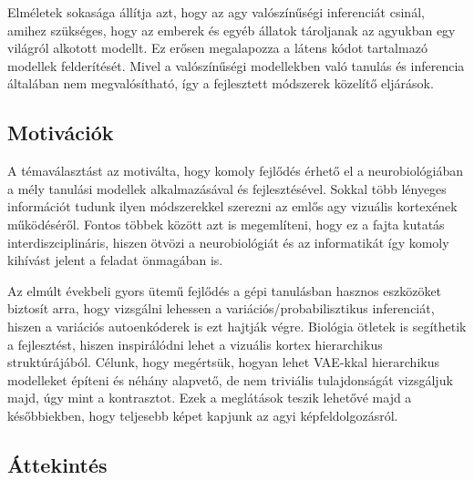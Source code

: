 \documentclass[12pt, english]{article}
\begin{document}
\vspace{4mm}

\par Elméletek sokasága állítja azt, hogy az agy valószínűségi inferenciát csinál, amihez szükséges, hogy az emberek és egyéb állatok tároljanak az agyukban egy világról alkotott modellt. Ez erősen megalapozza a látens kódot tartalmazó modellek felderítését. Mivel a valószínűségi modellekben való tanulás és inferencia általában nem megvalósítható, így a fejlesztett módszerek közelítő eljárások.

\vspace{7mm}

\subsection{Motivációk}

\vspace{7mm}

\par A témaválasztást az motiválta, hogy komoly fejlődés érhető el a neurobiológiában a mély tanulási modellek alkalmazásával és fejlesztésével. Sokkal több lényeges információt tudunk ilyen módszerekkel szerezni az emlős agy vizuális kortexének működéséről. Fontos többek között azt is megemlíteni, hogy ez a fajta kutatás interdiszciplináris, hiszen ötvözi a neurobiológiát és az informatikát így komoly kihívást jelent a feladat önmagában is.

\vspace{4mm}

\par Az elmúlt évekbeli gyors ütemű fejlődés a gépi tanulásban hasznos eszközöket biztosít arra, hogy vizsgálni lehessen a variációs/probabilisztikus inferenciát, hiszen a variációs autoenkóderek is ezt hajtják végre. Biológia ötletek is segíthetik a fejlesztést, hiszen inspirálódni lehet a vizuális kortex hierarchikus struktúrájából. Célunk, hogy megértsük, hogyan lehet VAE-kkal hierarchikus modelleket építeni és néhány alapvető, de nem triviális tulajdonságát vizsgáljuk majd, úgy mint a kontrasztot. Ezek a meglátások teszik lehetővé majd a későbbiekben, hogy teljesebb képet kapjunk az agyi képfeldolgozásról.

\vspace{7mm}

\subsection{Áttekintés}
\end{document}
